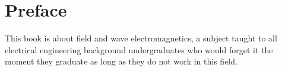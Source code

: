 \chapter*{Preface}

This book is about field and wave electromagnetics, a subject taught to all electrical engineering background undergraduates who would forget it the moment they graduate as long as they do not work in this field. 